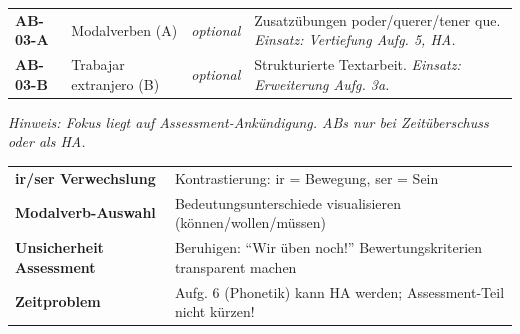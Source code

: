 \documentclass[11pt, a4paper]{article}
\begin{document}
\begin{tcolorbox}[
    colback=hellgrau,
    colframe=phase,
    title={\footnotesize\bfseries Arbeitsblätter},
    fonttitle=\bfseries,
    boxrule=0.5pt,
    top=2pt, bottom=2pt, left=4pt, right=4pt
]
\footnotesize
\begin{tabularx}{\textwidth}{@{}lp{3.5cm}lX@{}}
\textbf{AB-03-A} & Modalverben (A) & \textit{optional} & Zusatzübungen poder/querer/tener que. \textit{Einsatz: Vertiefung Aufg. 5, HA.} \\[0.2em]
\textbf{AB-03-B} & Trabajar extranjero (B) & \textit{optional} & Strukturierte Textarbeit. \textit{Einsatz: Erweiterung Aufg. 3a.} \\
\end{tabularx}

\vspace{0.1cm}
\textit{Hinweis: Fokus liegt auf Assessment-Ankündigung. ABs nur bei Zeitüberschuss oder als HA.}
\end{tcolorbox}

\vspace{0.2cm}


\begin{tcolorbox}[
    colback=white,
    colframe=spanisch,
    title={\footnotesize\bfseries Erwartete Schwierigkeiten},
    fonttitle=\bfseries,
    boxrule=0.5pt,
    top=2pt, bottom=2pt, left=4pt, right=4pt
]
\footnotesize
\begin{tabularx}{\textwidth}{@{}p{4cm}X@{}}
\textbf{ir/ser Verwechslung} & Kontrastierung: ir = Bewegung, ser = Sein \\
\textbf{Modalverb-Auswahl} & Bedeutungsunterschiede visualisieren (können/wollen/müssen) \\
\textbf{Unsicherheit Assessment} & Beruhigen: ``Wir üben noch!'' Bewertungskriterien transparent machen \\
\textbf{Zeitproblem} & Aufg. 6 (Phonetik) kann HA werden; Assessment-Teil nicht kürzen! \\
\end{tabularx}
\end{tcolorbox}
\end{document}
